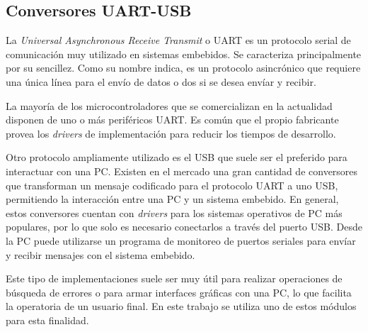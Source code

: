 \subsection{Conversores UART-USB}
\label{conversor_usb}
La \textit{Universal Asynchronous Receive Transmit} o UART es un protocolo serial de comunicación muy utilizado en sistemas embebidos. Se caracteriza principalmente por su sencillez. Como su nombre indica, es un protocolo asincrónico que requiere una única línea para el envío de datos o dos si se desea envíar y recibir.

La mayoría de los microcontroladores que se comercializan en la actualidad disponen de uno o más periféricos UART. Es común que el propio fabricante provea los \textit{drivers} de implementación para reducir los tiempos de desarrollo.

Otro protocolo ampliamente utilizado es el USB que suele ser el preferido para interactuar con una PC. Existen en el mercado una gran cantidad de conversores que transforman un mensaje codificado para el protocolo UART a uno USB, permitiendo la interacción entre una PC y un sistema embebido. En general, estos conversores cuentan con \textit{drivers} para los sistemas operativos de PC más populares, por lo que solo es necesario conectarlos a través del puerto USB. Desde la PC puede utilizarse un programa de monitoreo de puertos seriales para envíar y recibir mensajes con el sistema embebido.

Este tipo de implementaciones suele ser muy útil para realizar operaciones de búsqueda de errores o para armar interfaces gráficas con una PC, lo que facilita la operatoria de un usuario final. En este trabajo se utiliza uno de estos módulos para esta finalidad.
